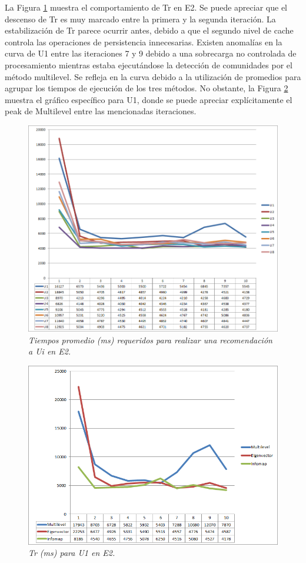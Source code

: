 La Figura \ref{fig:exp-im9} muestra el comportamiento de Tr en E2. Se puede apreciar que el descenso de Tr es muy marcado entre la primera y la segunda iteración. La estabilización de Tr parece ocurrir antes, debido a que el segundo nivel de cache controla las operaciones de persistencia innecesarias. Existen anomalías en la curva de U1 entre las iteraciones 7 y 9 debido a una sobrecarga no controlada de procesamiento mientras estaba ejecutándose la detección de comunidades por el método multilevel. Se refleja en la curva debido a la utilización de promedios para agrupar los tiempos de ejecución de los tres métodos. No obstante, la Figura \ref{fig:exp-im10} muestra el gráfico específico para U1, donde se puede apreciar explícitamente el peak de Multilevel entre las mencionadas iteraciones.

\begin{figure}[H]
  \centering
  \includegraphics[scale=.7]{images/Figura5-9}
  \caption{\em Tiempos promedio (ms) requeridos para realizar una recomendación a Ui en E2.}
  \label{fig:exp-im9}
\end{figure}

\begin{figure}[H]
  \centering
  \includegraphics[scale=.7]{images/Figura5-10}
  \caption{\em Tr (ms) para U1 en E2.}
  \label{fig:exp-im10}
\end{figure}

